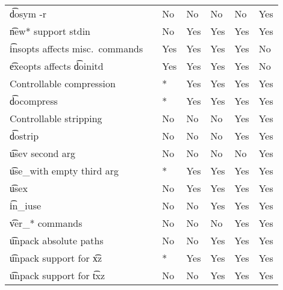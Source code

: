 \begin{landscape}
\begin{longtable}{llP{7.5em}P{7.5em}P{7.5em}P{7.5em}P{7.5em}}
\t{dosym -r} &  &
    No & No & No & No & Yes \\

\t{new*} support stdin &  &
    No & Yes & Yes & Yes & Yes \\

\t{insopts} affects misc.\ commands &  &
    Yes & Yes & Yes & Yes & No \\

\t{exeopts} affects \t{doinitd} &  &
    Yes & Yes & Yes & Yes & No \\

Controllable compression &  &
    * & Yes & Yes & Yes & Yes \\

\t{docompress} &  &
    * & Yes & Yes & Yes & Yes \\

Controllable stripping &  &
    No & No & No & Yes & Yes \\

\t{dostrip} &  &
    No & No & No & Yes & Yes \\

\t{usev} second arg &  &
    No & No & No & No & Yes \\

\t{use_with} empty third arg &  &
    * & Yes & Yes & Yes & Yes \\

\t{usex} &  &
    No & Yes & Yes & Yes & Yes \\

\t{in_iuse} &  &
    No & No & Yes & Yes & Yes \\

\t{ver_*} commands &  &
    No & No & No & Yes & Yes \\

\t{unpack} absolute paths &  &
    No & No & Yes & Yes & Yes \\

\t{unpack} support for \t{xz} &  &
    * & Yes & Yes & Yes & Yes \\

\t{unpack} support for \t{txz} &  &
    No & No & Yes & Yes & Yes \\


\end{longtable}
\end{landscape}
